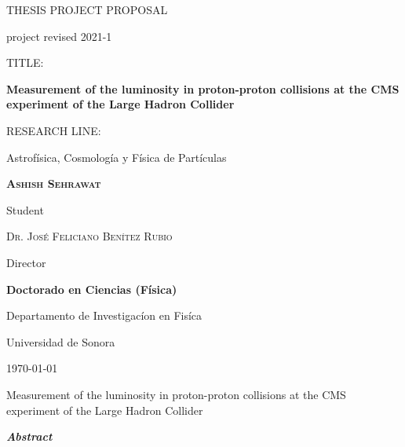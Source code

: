 \documentclass[final,12p]{article}
\def\Student{Ashish Sehrawat}
\def\Title{THESIS PROJECT PROPOSAL}
\def\Prog{Doctorado en Ciencias (F\'{i}sica) }
\def\Dept{Departamento de Investigac\'{i}on en Fis\'{i}ca}
\def\Institution{Universidad de Sonora}
\def\Director{Dr. Jos\'{e} Feliciano Ben\'{i}tez Rubio}
\def\ProjectTitle{Measurement of the luminosity in proton-proton collisions at the CMS experiment of the Large Hadron Collider}
\def\ResearchLine{Astrof\'{i}sica, Cosmolog\'{i}a y F\'{i}sica de Part\'{i}culas}
\begin{document}
\onehalfspacing

\begin{titlepage}
\centering
\hspace{0pt}
\vfill
{\scshape\Large \Title \par}
project revised 2021-1
  
  \vspace{2cm}
  {
    TITLE:\par
    {\bf \large \ProjectTitle \par}
  }
       
  \vspace{0.5cm}
  {
    RESEARCH LINE: \par
    \ResearchLine \par
  }
        
  \vspace{4cm}
  {\underline{\hspace{8cm}}\par}
  {\bf \scshape \Student \par}
  {Student\par}

  \vspace{1cm}
  {\underline{\hspace{8cm}}\par}
  {\scshape \Director \par}
  {Director\par}

  \vspace{1cm}
  {\bf \Prog \par}
  {\Dept \par}
  {\Institution \par}

  \vspace{4cm}
  {\today}

\hspace{0pt}
\vfill

\end{titlepage}


\shipout\null


\newpage
\hspace{2pt}
\vfill

  \begin{center}
    {\Large \ProjectTitle \par}
    \vspace{1cm}
    {\itshape\textbf{Abstract}\par}
  \end{center}
  
\end{document}
